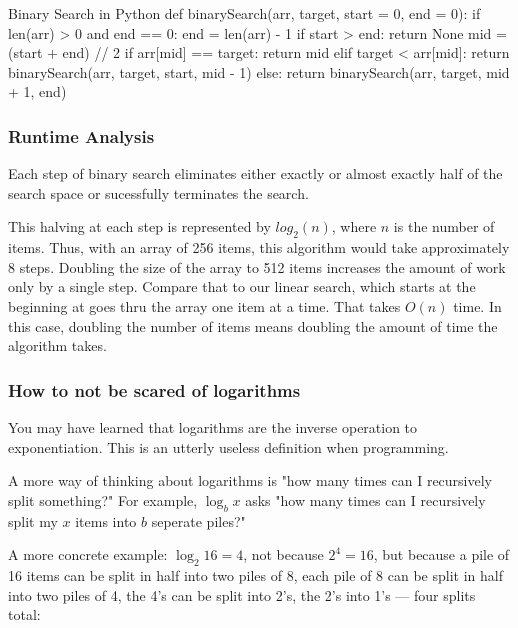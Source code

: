 \begin{pycode}{Binary Search in Python}
def binarySearch(arr, target, start = 0, end = 0):
	if len(arr) > 0 and end == 0:
		end = len(arr) - 1
	if start > end:
		return None
	mid = (start + end) // 2
	if arr[mid] == target:
		return mid
	elif target < arr[mid]:
		return binarySearch(arr, target, start, mid - 1)
	else:
		return binarySearch(arr, target, mid + 1, end)
\end{pycode}

\subsubsection{Runtime Analysis}
Each step of binary search eliminates either exactly or almost exactly half of the search space or sucessfully terminates the search.

This halving at each step is represented by $log_2(n)$, where $n$ is the number of items.  Thus, with an array of 256 items, this algorithm would take approximately 8 steps. Doubling the size of the array to 512 items increases the amount of work only by a single step.   Compare that to our linear search, which starts at the beginning at goes thru the array one item at a time.  That takes $O(n)$ time.  In this case, doubling the number of items means doubling the amount of time the algorithm takes.




\subsubsection{How to not be scared of logarithms }
You may have learned that logarithms are the inverse operation to exponentiation.
This is an utterly useless definition when programming.


A more way of thinking about logarithms is "how many times can I recursively split something?"
For example, $\log_b x$ asks "how many times can I recursively split my $x$ items into $b$ seperate piles?"

A more concrete example: $\log_2 16 = 4$, not because $2^4 = 16$, but because a pile of 16 items can be split in half into two piles of 8, each pile of 8 can be split in half into two piles of 4, the 4's can be split into 2's, the 2's into 1's --- four splits total:

